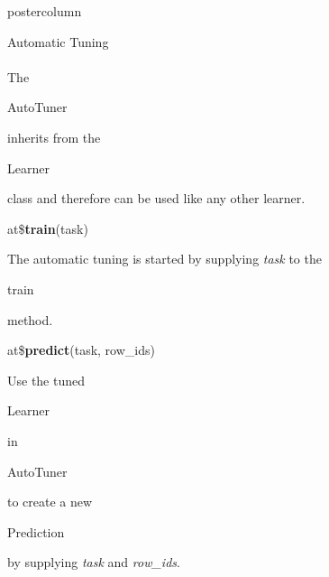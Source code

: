 \documentclass{beamer}
\newcommand{\codeinline}[1]{\begin{codeboxinline}#1\end{codeboxinline}}
\begin{document}
\begin{frame}[fragile]{}
\begin{columns}
\begin{column}{.245\textwidth}
\begin{beamercolorbox}[center]{postercolumn}
\begin{minipage}{.98\textwidth}
{\begin{myblock}{Automatic Tuning}
							\\
							\\
							The \codeinline{AutoTuner} inherits from the \codeinline{Learner} class and therefore can be used like any other learner.
							\\
							\begin{codebox}
								at\$\textbf{train}(task)
							\end{codebox}
							The automatic tuning is started by supplying \textit{task} to the \codeinline{train} method.
							\\
							\begin{codebox}
								at\$\textbf{predict}(task, row\_ids)
							\end{codebox}
							Use the tuned \codeinline{Learner} in \codeinline{AutoTuner} to create a new \codeinline{Prediction} by supplying \textit{task} and \textit{row\_ids}.
							\\
						\end{myblock}
						\vfill}
				\end{minipage}
			\end{beamercolorbox}
		\end{column}
	\end{columns}
\end{frame}
\end{document}
